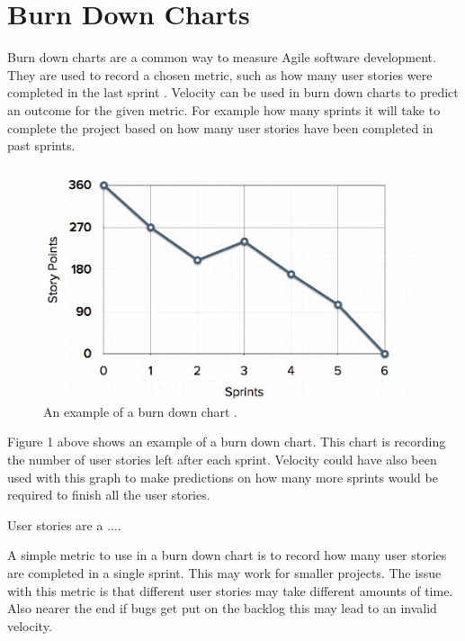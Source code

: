 \documentclass{scrartcl}
\begin{document}
\section{Burn Down Charts}
Burn down charts are a common way to measure Agile software development. They are used to record a chosen metric, such as how many user stories were completed in the last sprint \cite{AgileWithScrum}. Velocity can be used in burn down charts to predict an outcome for the given metric. For example how many sprints it will take to complete the project based on how many user stories have been completed in past sprints. %

\begin{figure}[h]
	\includegraphics[width=1.0\linewidth]{BDChart.jpg}
	\caption{ An example of a burn down chart \cite{MGS}.}
\end{figure}

Figure 1 above shows an example of a burn down chart. This chart is recording the number of user stories left after each sprint. Velocity could have also been used with this graph to make predictions on how many more sprints would be required to finish all the user stories.




User stories are a ....

A simple metric to use in a burn down chart is to record how many user stories are completed in a single sprint. This may work for smaller projects. The issue with this metric is that different user stories may take different amounts of time. Also nearer the end if bugs get put on the backlog this may lead to an invalid velocity. %

\end{document}
